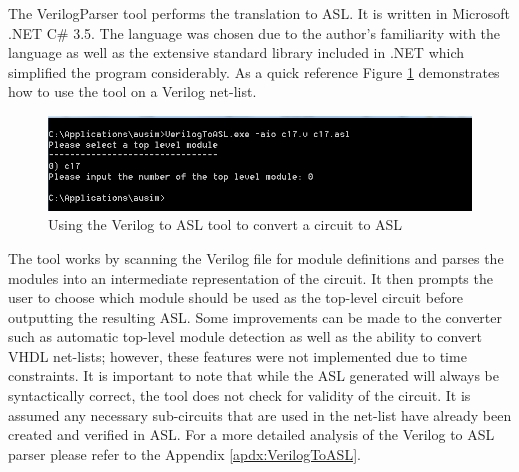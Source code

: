 \documentclass[12pt]{report}
\begin{document}
The VerilogParser tool performs the translation to ASL.  It is written in Microsoft .NET C\# 3.5.  The language was chosen due to the author's familiarity with the language as well as the extensive standard library included in .NET which simplified the program considerably\cite{csharp}.  As a quick reference Figure \ref{fig:VerilogParserUse} demonstrates how to use the tool on a Verilog net-list.
\begin{figure}
	\begin{center}
		\includegraphics[scale=.9]{images/verilog-asl-command}
	\end{center}
	\caption{Using the Verilog to ASL tool to convert a circuit to ASL}
	\label{fig:VerilogParserUse}
\end{figure}
The tool works by scanning the Verilog file for module definitions and parses the modules into an intermediate representation of the circuit.  It then prompts the user to choose which module should be used as the top-level circuit before outputting the resulting ASL.  Some improvements can be made to the converter such as automatic top-level module detection as well as the ability to convert VHDL net-lists; however, these features were not implemented due to time constraints.  It is important to note that while the ASL generated will always be syntactically correct, the tool does not check for validity of the circuit.  It is assumed any necessary sub-circuits that are used in the net-list have already been created and verified in ASL.  For a more detailed analysis of the Verilog to ASL parser please refer to the Appendix \ref{apdx:VerilogToASL}.  
\end{document}
